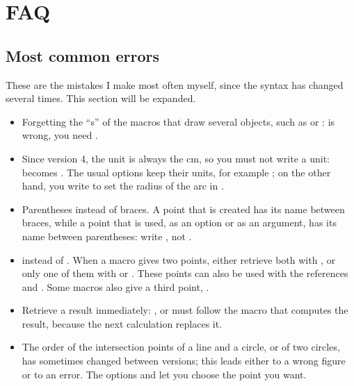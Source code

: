 \section{FAQ}

\subsection{Most common errors}
These are the mistakes I make most often myself, since the syntax has changed several times. This section will be expanded.

\begin{itemize}\setlength{\itemsep}{10pt}
  \item Forgetting the ``s'' of the macros that draw several objects, such as  or :  is wrong, you need .

  \item Since version 4, the unit is always the cm, so you must not write a unit:  becomes . The usual  options keep their units, for example ; on the other hand, you write  to set the radius of the arc in .

  \item Parentheses instead of braces. A point that is created has its name between braces, while a point that is used, as an option or as an argument, has its name between parentheses: write , not .

  \item {} instead of . When a macro gives two points, either retrieve both with , or only one of them with  or . These points can also be used with the references  and . Some macros also give a third point, .

  \item Retrieve a result immediately: ,  or  must follow the macro that computes the result, because the next calculation replaces it.

  \item The order of the intersection points of a line and a circle, or of two circles, has sometimes changed between versions; this leads either to a wrong figure or to an error. The options  and  let you choose the point you want.


\end{itemize}
